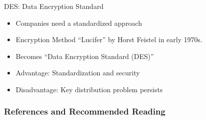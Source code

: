 \documentclass[]{beamer}
\begin{document}
\begin{frame}{DES: Data Encryption Standard}
	\begin{itemize}
		\item<1-> Companies need a standardized approach
		\item<2-> Encryption Method ``Lucifer'' by Horst Feistel in early 1970s.
		\item<3-> Becomes ``Data Encryption Standard (DES)''
		\item<4-> Advantage: Standardization and security
		\item<5-> Disadvantage: Key distribution problem persists
	\end{itemize}
\end{frame}

\begin{frame}%
\frametitle{References and Recommended Reading}
	
	
\end{frame}
\end{document}

